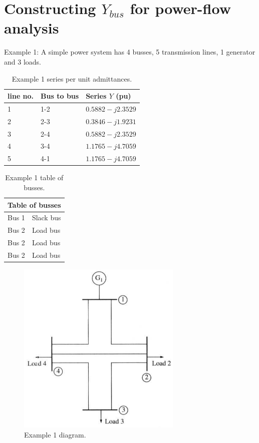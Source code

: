 \section{Constructing $Y_{bus}$ for power-flow analysis}
Example 1: A simple power system has 4 busses, 5 transmission lines, 1 generator and 3 loads.
\begin{table}[H]
	\centering
	\begin{tabular}{@{}lll@{}}
		\toprule
		\textbf{line no.} & \textbf{Bus to bus} & \textbf{Series $Y$ (pu)} \\
		\midrule
		1                 & 1-2                 & $0.5882 - j2.3529$       \\
		2                 & 2-3                 & $0.3846 - j1.9231$       \\
		3                 & 2-4                 & $0.5882 - j2.3529$       \\
		4                 & 3-4                 & $1.1765 - j4.7059$       \\
		5                 & 4-1                 & $1.1765 - j4.7059$       \\
		\bottomrule
	\end{tabular}
	\caption{Example 1 series per unit admittances.}
\end{table}
\begin{table}[H]
	\centering
	\begin{tabular}{@{}ll@{}}
		\toprule
		\multicolumn{2}{l}{\textbf{Table of busses}} \\
		\midrule
		Bus 1 & Slack bus                            \\
		Bus 2 & Load bus                             \\
		Bus 2 & Load bus                             \\
		Bus 2 & Load bus                             \\
		\bottomrule
	\end{tabular}
	\caption{Example 1 table of busses.}
\end{table}
\begin{figure}[H]
	\centering
	\includegraphics[width = 0.7\textwidth]{./img/figure50.png}
	\caption{Example 1 diagram.}
\end{figure}
